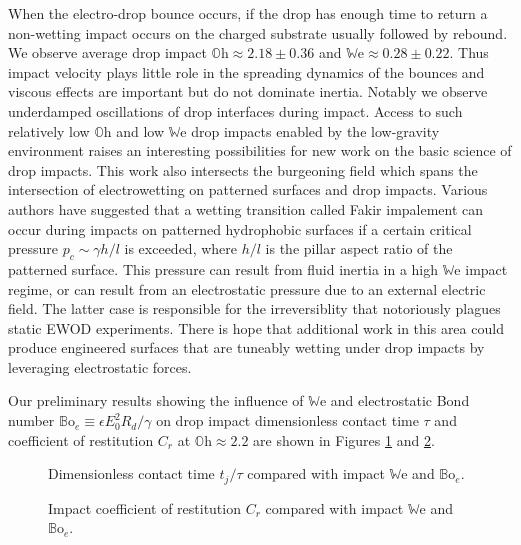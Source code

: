 \documentclass[12pt,a4paper,oneside]{book}
\begin{document}
When the electro-drop bounce occurs, if the drop has enough time to return a non-wetting impact occurs on the charged substrate usually followed by rebound. We observe average drop impact $\mathbb{O}\mbox{h} \approx 2.18 \pm 0.36$ and  $\mathbb{W}\mbox{e} \approx 0.28 \pm 0.22$. Thus impact velocity plays little role in the spreading dynamics of the bounces and viscous effects are important but do not dominate inertia. Notably we observe underdamped oscillations of drop interfaces during impact. Access to such relatively low $\mathbb{O}\mbox{h}$ and low $\mathbb{W}\mbox{e}$ drop impacts enabled by the low-gravity environment raises an interesting possibilities for new work on the basic science of drop impacts. This work also intersects the burgeoning field which spans the intersection of electrowetting on patterned surfaces and drop impacts. Various authors \cite{bartolo_bouncing_2006, reyssat_bouncing_2006} have suggested that a wetting transition called Fakir impalement can occur during impacts on patterned hydrophobic surfaces if a certain critical pressure $p_c \sim \gamma h/l$ is exceeded, where $h/l$ is the pillar aspect ratio of the patterned surface. This pressure can result from fluid inertia in a high $\mathbb{W}\mbox{e}$ impact regime, or can result from an electrostatic pressure due to an external electric field. The latter case is responsible for the irreversiblity that notoriously plagues static EWOD experiments. There is hope that additional work in this area could produce engineered surfaces that are tuneably wetting under drop impacts by leveraging electrostatic forces.
 
Our preliminary results showing the influence of $\mathbb{W}\mbox{e}$ and electrostatic Bond number $\mathbb{B}\mbox{o}_e \equiv \epsilon E_0^2 R_d/\gamma $ on drop impact dimensionless contact time $\tau$ and coefficient of restitution $C_r$ at $\mathbb{O}\mbox{h} \approx 2.2$ are shown in Figures \ref{fig:contact} and \ref{fig:restitution}.

\begin{figure}[htb]
    \centering
    
    \caption{Dimensionless contact time $t_j/\tau$ compared with impact $\mathbb{W}\mbox{e}$ and $\mathbb{B}\mbox{o}_e$.\label{fig:contact}}
\end{figure}

\begin{figure}[htb]
    \centering
    
    \caption{Impact coefficient of restitution $C_r$ compared with impact $\mathbb{W}\mbox{e}$ and $\mathbb{B}\mbox{o}_e$.\label{fig:restitution}}
\end{figure}
\end{document}
